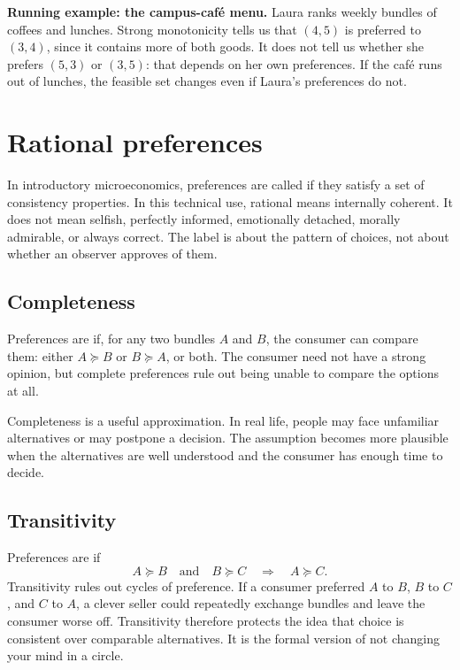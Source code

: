 \begin{exercisebox}
\textbf{Running example: the campus-caf\'e menu.} Laura ranks weekly bundles
of coffees and lunches. Strong monotonicity tells us that $(4,5)$ is preferred
to $(3,4)$, since it contains more of both goods. It does not tell us whether
she prefers $(5,3)$ or $(3,5)$: that depends on her own preferences. If the
caf\'e runs out of lunches, the feasible set changes even if Laura's
preferences do not.
\end{exercisebox}

\section{Rational preferences}

In introductory microeconomics, preferences are called  if
they satisfy a set of consistency properties. In this technical use, rational
means internally coherent. It does not mean selfish, perfectly informed,
emotionally detached, morally admirable, or always correct. The label is
about the pattern of choices, not about whether an observer approves of them.

\subsection{Completeness}

Preferences are  if, for any two bundles $A$ and $B$, the
consumer can compare them: either $A\succeq B$ or $B\succeq A$, or both. The
consumer need not have a strong opinion, but complete preferences rule out
being unable to compare the options at all.

Completeness is a useful approximation. In real life, people may face unfamiliar alternatives or may postpone a decision. The assumption becomes more plausible when the alternatives are well understood and the consumer has enough time to decide.

\subsection{Transitivity}

Preferences are  if
\[
A\succeq B \quad \text{and} \quad B\succeq C
\quad \Longrightarrow \quad A\succeq C.
\]
Transitivity rules out cycles of preference. If a consumer preferred $A$ to
$B$, $B$ to $C$, and $C$ to $A$, a clever seller could repeatedly exchange
bundles and leave the consumer worse off. Transitivity therefore protects the
idea that choice is consistent over comparable alternatives. It is the formal
version of not changing your mind in a circle.

